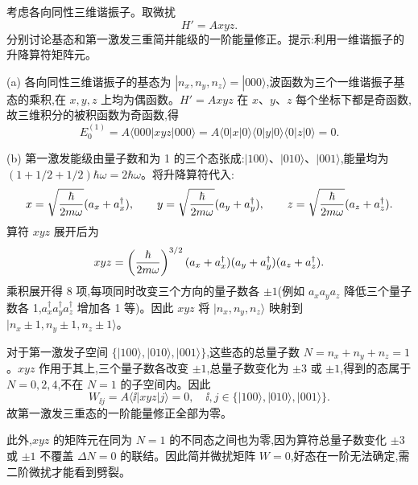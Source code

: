 \begin{question}
考虑各向同性三维谐振子。取微扰
\[
H'=Axyz.
\]
分别讨论基态和第一激发三重简并能级的一阶能量修正。提示:利用一维谐振子的升降算符矩阵元。
\end{question}
\begin{solution}
(a) 各向同性三维谐振子的基态为 $|n_x,n_y,n_z\rangle=|000\rangle$,波函数为三个一维谐振子基态的乘积,在 $x,y,z$ 上均为偶函数。$H'=Axyz$ 在 $x$、$y$、$z$ 每个坐标下都是奇函数,故三维积分的被积函数为奇函数,得
\[
E_0^{(1)}=A\langle000|xyz|000\rangle
=A\langle0|x|0\rangle\langle0|y|0\rangle\langle0|z|0\rangle=0.
\]

(b) 第一激发能级由量子数和为 1 的三个态张成:$|100\rangle$、$|010\rangle$、$|001\rangle$,能量均为 $(1+1/2+1/2)\hbar\omega=2\hbar\omega$。将升降算符代入:
\[
x=\sqrt{\hbar\over2m\omega}(a_x+a_x^\dagger),\qquad
y=\sqrt{\hbar\over2m\omega}(a_y+a_y^\dagger),\qquad
z=\sqrt{\hbar\over2m\omega}(a_z+a_z^\dagger).
\]
算符 $xyz$ 展开后为
\[
xyz = \left({\hbar\over2m\omega}\right)^{3/2}(a_x+a_x^\dagger)(a_y+a_y^\dagger)(a_z+a_z^\dagger).
\]
乘积展开得 8 项,每项同时改变三个方向的量子数各 $\pm1$(例如 $a_x a_y a_z$ 降低三个量子数各 1,$a_x^\dagger a_y^\dagger a_z^\dagger$ 增加各 1 等)。因此 $xyz$ 将 $|n_x,n_y,n_z\rangle$ 映射到 $|n_x\pm1,n_y\pm1,n_z\pm1\rangle$。

对于第一激发子空间 $\{|100\rangle,|010\rangle,|001\rangle\}$,这些态的总量子数 $N=n_x+n_y+n_z=1$。$xyz$ 作用于其上,三个量子数各改变 $\pm1$,总量子数变化为 $\pm3$ 或 $\pm1$,得到的态属于 $N=0,2,4$,不在 $N=1$ 的子空间内。因此
\[
W_{\ii j}=A\langle \ii|xyz|j\rangle = 0,\quad \ii,j\in\{|100\rangle,|010\rangle,|001\rangle\}.
\]
故第一激发三重态的一阶能量修正全部为零。

此外,$xyz$ 的矩阵元在同为 $N=1$ 的不同态之间也为零,因为算符总量子数变化 $\pm3$ 或 $\pm1$ 不覆盖 $\Delta N=0$ 的联结。因此简并微扰矩阵 $W=0$,好态在一阶无法确定,需二阶微扰才能看到劈裂。
\end{solution}

